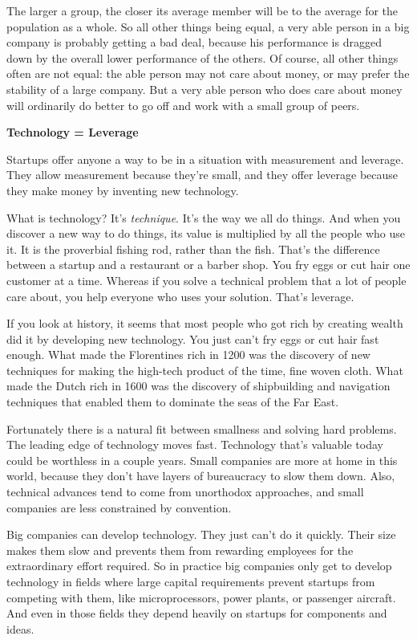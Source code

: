 The larger a group, the closer its average member will be to the average
for the population as a whole. So all other things being equal, a very
able person in a big company is probably getting a bad deal, because his
performance is dragged down by the overall lower performance of the
others. Of course, all other things often are not equal: the able person
may not care about money, or may prefer the stability of a large
company. But a very able person who does care about money will
ordinarily do better to go off and work with a small group of peers.

\textbf{Technology = Leverage}

Startups offer anyone a way to be in a situation with measurement and
leverage. They allow measurement because they're small, and they offer
leverage because they make money by inventing new technology.

What is technology? It's \emph{technique}. It's the way we all do
things. And when you discover a new way to do things, its value is
multiplied by all the people who use it. It is the proverbial fishing
rod, rather than the fish. That's the difference between a startup and a
restaurant or a barber shop. You fry eggs or cut hair one customer at a
time. Whereas if you solve a technical problem that a lot of people care
about, you help everyone who uses your solution. That's leverage.

If you look at history, it seems that most people who got rich by
creating wealth did it by developing new technology. You just can't fry
eggs or cut hair fast enough. What made the Florentines rich in 1200 was
the discovery of new techniques for making the high-tech product of the
time, fine woven cloth. What made the Dutch rich in 1600 was the
discovery of shipbuilding and navigation techniques that enabled them to
dominate the seas of the Far East.

Fortunately there is a natural fit between smallness and solving hard
problems. The leading edge of technology moves fast. Technology that's
valuable today could be worthless in a couple years. Small companies are
more at home in this world, because they don't have layers of
bureaucracy to slow them down. Also, technical advances tend to come
from unorthodox approaches, and small companies are less constrained by
convention.

Big companies can develop technology. They just can't do it quickly.
Their size makes them slow and prevents them from rewarding employees
for the extraordinary effort required. So in practice big companies only
get to develop technology in fields where large capital requirements
prevent startups from competing with them, like microprocessors, power
plants, or passenger aircraft. And even in those fields they depend
heavily on startups for components and ideas.

